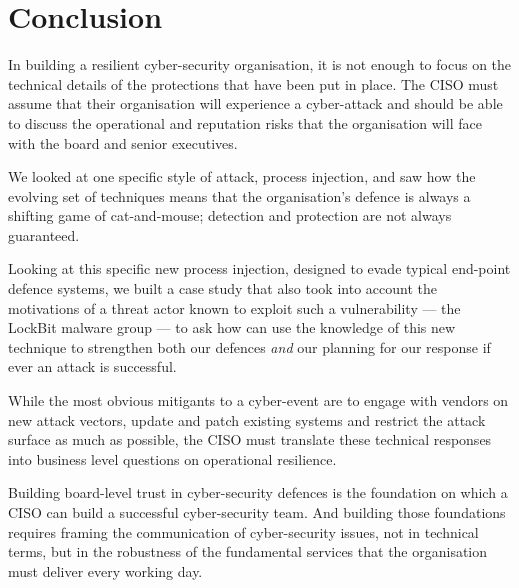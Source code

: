 \section{Conclusion}

In building a resilient cyber-security organisation, it is not enough to focus on the technical details of the protections that
have been put in place.  The CISO must assume that their organisation will experience a cyber-attack and should be able to discuss
the operational and reputation risks that the organisation will face with the board and senior executives.

We looked at one specific style of attack, process injection, and saw how the evolving set of techniques means that the
organisation's defence is always a shifting game of cat-and-mouse; detection and protection are not always guaranteed.

Looking at this specific new process injection, designed to evade typical end-point defence systems, we built a case study that
also took into account the motivations of a threat actor known to exploit such a vulnerability --- the LockBit malware group ---
to ask how can  use the knowledge of this new technique to strengthen both our defences \textit{and} our planning for our response if ever an
attack is successful.

While the most obvious mitigants to a cyber-event are to engage with vendors on new attack vectors, update and patch existing systems and
restrict the attack surface as much as possible, the CISO must translate these technical responses into business level questions on operational
resilience.

Building board-level trust in cyber-security defences is the foundation on which a CISO can build a successful cyber-security team.  And
building those foundations requires framing the communication of cyber-security issues, not in technical terms, but in the robustness
of the fundamental services that the organisation must deliver every working day.




